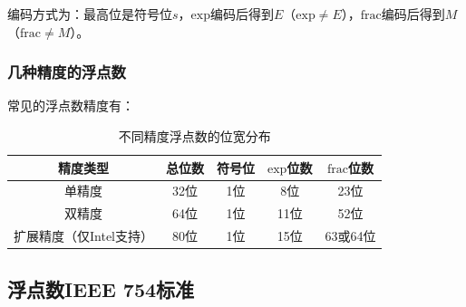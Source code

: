 \documentclass[a4paper, 12pt, UTF8]{ctexart}
\begin{document}
编码方式为：最高位是符号位\(s\)，\(\text{exp}\)编码后得到\(E\)（\(\text{exp}\neq E\)），\(\text{frac}\)编码后得到\(M\)（\(\text{frac}\neq M\)）。

\subsubsection{几种精度的浮点数}
常见的浮点数精度有：
\begin{table}[h]
    \centering
    \begin{tabular}{|c|c|c|c|c|}
        \hline
        精度类型           & 总位数 & 符号位 & \(\text{exp}\)位数 & \(\text{frac}\)位数 \\
        \hline
        单精度            & 32位 & 1位  & 8位               & 23位               \\
        双精度            & 64位 & 1位  & 11位              & 52位               \\
        扩展精度（仅Intel支持） & 80位 & 1位  & 15位              & 63或64位            \\
        \hline
    \end{tabular}
    \caption{不同精度浮点数的位宽分布}
\end{table}

\subsection{浮点数IEEE 754标准}
\end{document}
